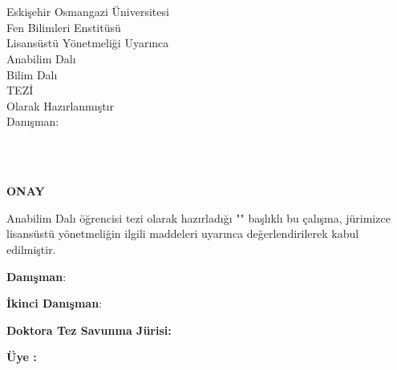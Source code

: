 \documentclass[]{esogu}			%
\begin{document}
\begin{titlingpage*}
\begin{center}
\footnotesize
\begin{vplace}							%
\tbaslik\\								%
\vspace{7pc}							%
\yazar	\\								%
\vspace{7pc}							%
Eskişehir Osmangazi Üniversitesi\\		
Fen Bilimleri Enstitüsü\\
Lisansüstü Yönetmeliği Uyarınca\\
\bolum \space Anabilim Dalı\\
\bilim \space Bilim Dalı\\
\unvan \space TEZİ\\
Olarak Hazırlanmıştır\\
\vspace{7pc}
Danışman:\space \danisman\\			
\vspace{2pc}
\proje\\ 								%
\end{vplace}

\vfill
\teslim\\
\vspace{2cm}
\end{center}

\end{titlingpage*}
\normalsize

\thispagestyle{empty}
\begin{center}
\huge
\textbf{ONAY} 
\normalsize
\end{center}
\bolum \space Anabilim Dalı \unvan \space öğrencisi \yazar \space tezi olarak hazırladığı "\tbaslik" başlıklı bu çalışma, jürimizce lisansüstü yönetmeliğin ilgili maddeleri uyarınca değerlendirilerek kabul edilmiştir.

\noindent \textbf{Danışman}\space\space\space\space\space\space\space\space:\space \danisman 

\noindent \textbf{İkinci Danışman}\space:\space \ikidanisman
\newline

\noindent \textbf{Doktora Tez Savunma Jürisi:}

\noindent \textbf{Üye :\space}\jbir
\end{document}
